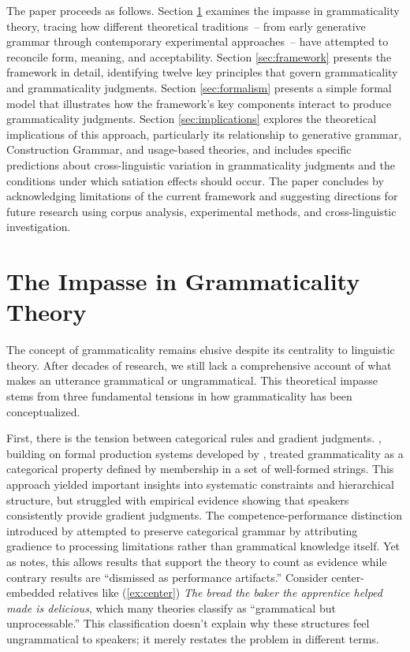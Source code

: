 \documentclass[12pt,letterpaper]{article}
\begin{document}
The paper proceeds as follows. Section \ref{sec:previous} examines the impasse in grammaticality theory, tracing how different theoretical traditions~-- from early generative grammar through contemporary experimental approaches~-- have attempted to reconcile form, meaning, and acceptability. Section \ref{sec:framework} presents the framework in detail, identifying twelve key principles that govern grammaticality and grammaticality judgments. Section \ref{sec:formalism} presents a simple formal model that illustrates how the framework's key components interact to produce grammaticality judgments. Section \ref{sec:implications} explores the theoretical implications of this approach, particularly its relationship to generative grammar, Construction Grammar, and usage-based theories, and includes specific predictions about cross-linguistic variation in grammaticality judgments and the conditions under which satiation effects should occur. The paper concludes by acknowledging limitations of the current framework and suggesting directions for future research using corpus analysis, experimental methods, and cross-linguistic investigation.

\section{The Impasse in Grammaticality Theory}\label{sec:previous}

The concept of grammaticality remains elusive despite its centrality to linguistic theory. After decades of research, we still lack a comprehensive account of what makes an utterance grammatical or ungrammatical. This theoretical impasse stems from three fundamental tensions in how grammaticality has been conceptualized.

First, there is the tension between categorical rules and gradient judgments. \textcite{chomsky1957}, building on formal production systems developed by \textcite{post1943}, treated grammaticality as a categorical property defined by membership in a set of well-formed strings. This approach yielded important insights into systematic constraints and hierarchical structure, but struggled with empirical evidence showing that speakers consistently provide gradient judgments. The competence-performance distinction introduced by \textcite{chomsky1965} attempted to preserve categorical grammar by attributing gradience to processing limitations rather than grammatical knowledge itself. Yet as \textcite[71]{schutze2016} notes, this allows results that support the theory to count as evidence while contrary results are \enquote{dismissed as performance artifacts.} Consider center-embedded relatives like (\ref{ex:center}) \textit{The bread the baker the apprentice helped made is delicious}, which many theories classify as \enquote{grammatical but unprocessable.} This classification doesn't explain why these structures feel ungrammatical to speakers; it merely restates the problem in different terms.
\end{document}

